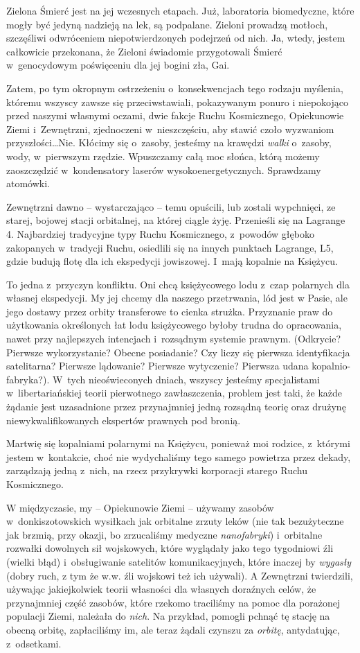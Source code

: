 \documentclass[oneside,polish,11pt,sfheadings]{mwbk}
\begin{document}
Zielona Śmierć jest na jej wczesnych etapach. Już, laboratoria
biomedyczne, które mogły być jedyną nadzieją na lek, są podpalane.
Zieloni prowadzą motłoch, szczęśliwi odwróceniem niepotwierdzonych
podejrzeń od nich. Ja, wtedy, jestem całkowicie przekonana, że Zieloni
świadomie przygotowali Śmierć w~genocydowym poświęceniu dla jej bogini
zła, Gai.

Zatem, po tym okropnym ostrzeżeniu o~konsekwencjach tego rodzaju
myślenia, któremu wszyscy zawsze się przeciwstawiali, pokazywanym ponuro
i niepokojąco przed naszymi własnymi oczami, dwie fakcje Ruchu
Kosmicznego, Opiekunowie Ziemi i~Zewnętrzni, zjednoczeni w~nieszczęściu,
aby stawić czoło wyzwaniom przyszłości\ldots  Nie. Kłócimy się o~zasoby,
jesteśmy na krawędzi \textit{walki} o~zasoby, wody, w~pierwszym rzędzie.
Wpuszczamy całą moc słońca, którą możemy zaoszczędzić w~kondensatory
laserów wysokoenergetycznych. Sprawdzamy atomówki.

Zewnętrzni dawno -- wystarczająco -- temu opuścili, lub zostali
wypchnięci, ze starej, bojowej stacji orbitalnej, na której ciągle żyję.
Przenieśli się na Lagrange 4. Najbardziej tradycyjne typy Ruchu
Kosmicznego, z~powodów głęboko zakopanych w~tradycji Ruchu, osiedlili
się na innych punktach Lagrange, L5, gdzie budują flotę dla ich
ekspedycji jowiszowej. I~mają kopalnie na Księżycu.

To jedna z~przyczyn konfliktu. Oni chcą księżycowego lodu z~czap polarnych
dla własnej ekspedycji. My jej chcemy dla naszego przetrwania, lód jest
w Pasie, ale jego dostawy przez orbity transferowe to cienka strużka.
Przyznanie praw do użytkowania określonych łat lodu księżycowego byłoby
trudna do opracowania, nawet przy najlepszych intencjach i~rozsądnym
systemie prawnym. (Odkrycie? Pierwsze wykorzystanie? Obecne posiadanie?
Czy liczy się pierwsza identyfikacja satelitarna? Pierwsze lądowanie?
Pierwsze wytyczenie? Pierwsza udana kopalnio-fabryka?). W~tych
nieoświeconych dniach, wszyscy jesteśmy specjalistami w~libertariańskiej
teorii pierwotnego zawłaszczenia, problem jest taki, że każde żądanie
jest uzasadnione przez przynajmniej jedną rozsądną teorię oraz drużynę
niewykwalifikowanych ekspertów prawnych pod bronią.

Martwię się kopalniami polarnymi na Księżycu, ponieważ moi rodzice, z~którymi jestem w~kontakcie, choć nie wydychaliśmy tego samego powietrza
przez dekady, zarządzają jedną z~nich, na rzecz przykrywki korporacji
starego Ruchu Kosmicznego.

W międzyczasie, my -- Opiekunowie Ziemi -- używamy zasobów w~donkiszotowskich wysiłkach jak orbitalne zrzuty leków (nie tak
bezużyteczne jak brzmią, przy okazji, bo zrzucaliśmy medyczne
\textit{nanofabryki}) i~orbitalne rozwałki dowolnych sił wojskowych, które
wyglądały jako tego tygodniowi źli (wielki błąd) i~obsługiwanie
satelitów komunikacyjnych, które inaczej by \textit{wygasły} (dobry ruch,
z tym że w.w. źli wojskowi też ich używali). A Zewnętrzni twierdzili,
używając jakiejkolwiek teorii własności dla własnych doraźnych celów, że
przynajmniej część zasobów, które rzekomo traciliśmy na pomoc dla
porażonej populacji Ziemi, należała do \textit{nich}. Na przykład, pomogli
pchnąć tę stację na obecną orbitę, zapłaciliśmy im, ale teraz żądali
czynszu za \textit{orbitę}, antydatując, z~odsetkami.
\end{document}
